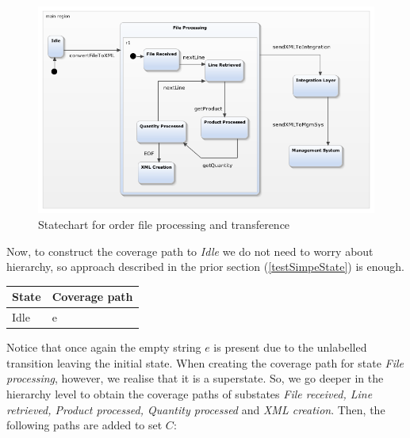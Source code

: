 \begin{figure}[htb]
\centering
\includegraphics[width=15cm]{figuras/webEDI}
\caption{\label{fig:webEDI} Statechart for order file processing and transference}
\end{figure}

Now, to construct the coverage path to \textit{Idle} we do not need to worry about hierarchy, so approach described in the prior section (\ref{testSimpeState}) is enough.

\begin{center}
\begin{tabular}{| l | l|}

\hline

State & Coverage path \\ \hline

Idle & e \\

\hline
\end{tabular}
\end{center}

Notice that once again the empty string $e$ is present due to the unlabelled transition leaving the initial state.
%
When creating the coverage path for state \textit{File processing}, however, we realise that it is a superstate. So, we go deeper in the hierarchy level to obtain the coverage paths of substates \textit{File received, Line retrieved, Product processed, Quantity processed} and \textit{XML creation}. Then,  the following paths are added to set $C$:

